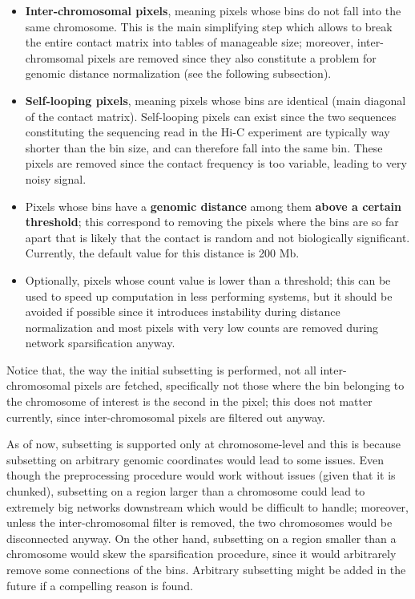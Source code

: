 \begin{itemize}\tightlist
  \item \textbf{Inter-chromosomal pixels}, meaning pixels whose bins do not fall into the same chromosome. This is the main simplifying step which allows to break the entire contact matrix into tables of manageable size; moreover, inter-chromsomal pixels are removed since they also constitute a problem for genomic distance normalization (see the following subsection).
  \item \textbf{Self-looping pixels}, meaning pixels whose bins are identical (main diagonal of the contact matrix). Self-looping pixels can exist since the two sequences constituting the sequencing read in the Hi-C experiment are typically way shorter than the bin size, and can therefore fall into the same bin. These pixels are removed since the contact frequency is too variable, leading to very noisy signal.
  \item Pixels whose bins have a \textbf{genomic distance} among them \textbf{above a certain threshold}; this correspond to removing the pixels where the bins are so far apart that is likely that the contact is random and not biologically significant. Currently, the default value for this distance is 200 Mb.
  \item Optionally, pixels whose count value is lower than a threshold; this can be used to speed up computation in less performing systems, but it should be avoided if possible since it introduces instability during distance normalization and most pixels with very low counts are removed during network sparsification anyway.
\end{itemize}

Notice that, the way the initial subsetting is performed, not all inter-chromosomal pixels are fetched, specifically not those where the bin belonging to the chromosome of interest is the second in the pixel; this does not matter currently, since inter-chromosomal pixels are filtered out anyway. 

As of now, subsetting is supported only at chromosome-level and this is because subsetting on arbitrary genomic coordinates would lead to some issues. Even though the preprocessing procedure would work without issues (given that it is chunked), subsetting on a region larger than a chromosome could lead to extremely big networks downstream which would be difficult to handle; moreover, unless the inter-chromosomal filter is removed, the two chromosomes would be disconnected anyway. On the other hand, subsetting on a region smaller than a chromosome would skew the sparsification procedure, since it would arbitrarely remove some connections of the bins. Arbitrary subsetting might be added in the future if a compelling reason is found.

